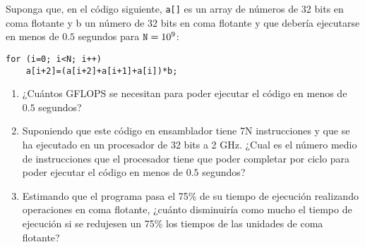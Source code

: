 \begin{ejercicio}
    Suponga que, en el código siguiente, \verb|a[]| es un array de números de 32 bits en coma flotante y b
    un número de 32 bits en coma flotante y que debería ejecutarse en menos de $0.5$ segundos para $\verb|N|=10^9$:
    \begin{verbatim}
for (i=0; i<N; i++)
    a[i+2]=(a[i+2]+a[i+1]+a[i])*b;
    \end{verbatim}

    \begin{enumerate}
        \item ¿Cuántos GFLOPS se necesitan para poder ejecutar el código en menos de $0.5$ segundos?
        \item Suponiendo que este código en ensamblador tiene 7N instrucciones y que se ha ejecutado en un
        procesador de 32 bits a 2 GHz. ¿Cual es el número medio de instrucciones que el procesador tiene que poder
        completar por ciclo para poder ejecutar el código en menos de $0.5$ segundos?
        \item Estimando que el programa pasa el 75\% de su tiempo de ejecución realizando operaciones en coma
        flotante, ¿cuánto disminuiría como mucho el tiempo de ejecución si se redujesen un 75\% los tiempos de las
        unidades de coma flotante?
    \end{enumerate}
\end{ejercicio}


